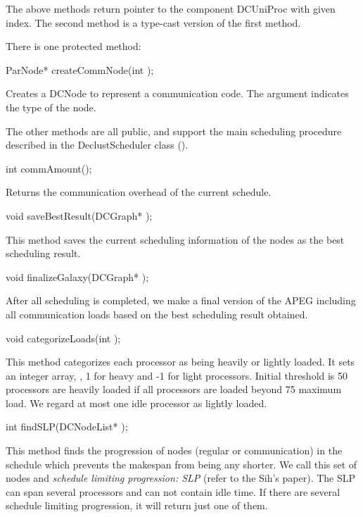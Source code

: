 The above methods return pointer to the component DCUniProc with given index.
The second method is a type-cast version of the first method.

There is one protected method:

\begin{example}
ParNode* createCommNode(int );
\end{example}

Creates a DCNode to represent a communication code. The argument indicates
the type of the node.

The other methods are all public, and support the main scheduling procedure
described in the DeclustScheduler class ().

\begin{example}
int commAmount();
\end{example}

Returns the communication overhead of the current schedule.

\begin{example}
void saveBestResult(DCGraph* );
\end{example}

This method saves the current scheduling information of the nodes as the best
scheduling result.

\begin{example}
void finalizeGalaxy(DCGraph* );
\end{example}

After all scheduling is completed, we make a final version of the APEG
including all communication loads based on the best scheduling result
obtained.

\begin{example}
void categorizeLoads(int );
\end{example}

This method categorizes each processor as being heavily or lightly loaded.
It sets an integer array, , 1 for heavy and -1 for light
processors. Initial threshold is 50%
processors are heavily loaded if all processors are loaded beyond 75%
maximum load. We regard at most one idle processor as lightly loaded. 

\begin{example}
int findSLP(DCNodeList* );
\end{example}

This method finds the progression of nodes (regular or communication)
in the schedule which prevents the makespan from being any shorter. We call
this set of nodes and \emph{schedule limiting progression: SLP} (refer to
the Sih's paper). The SLP can span several processors and can not contain
idle time. If there are several schedule limiting progression, it will
return just one of them.

